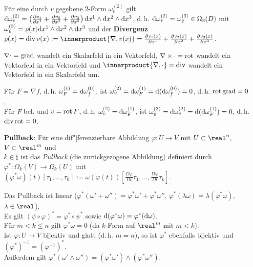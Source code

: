 Für eine durch $v$ gegebene $2$-Form $\omega_v^{(2)}$ gilt
$\mathrm{d} \omega_v^{(2)} = \left(\frac{\partial v_1}{\partial x^1} +
\frac{\partial v_2}{\partial x^2} + \frac{\partial v_3}{\partial x^3}\right)
\mathrm{d} x^1 \land \mathrm{d} x^2 \land \mathrm{d} x^3$, d.\,h.
$\mathrm{d} \omega_v^{(2)} = \omega_\varrho^{(3)} \in \Omega_3(D)$ mit
$\omega_\varrho^{(3)} = \varrho(x) \mathrm{d} x^1 \land \mathrm{d} x^2 \land \mathrm{d} x^3$ und
der \textbf{Divergenz} \\
$\varrho(x) = \div v(x) := \innerproduct{\nabla, v(x)} =
\frac{\partial v_1(x)}{\partial x^1} +
\frac{\partial v_2(x)}{\partial x^2} + \frac{\partial v_3(x)}{\partial x^3}$.

$\nabla \cdot = \operatorname{grad}$ wandelt ein Skalarfeld in ein Vektorfeld,
$\nabla \times \cdot = \operatorname{rot}$ wandelt ein Vektorfeld in ein Vektorfeld und
$\innerproduct{\nabla, \cdot} = \div$ wandelt ein Vektorfeld in ein Skalarfeld um.

Für $F = \nabla f$, d.\,h. $\omega_F^{(1)} = \mathrm{d} \omega_f^{(0)}$, ist
$\omega_v^{(2)} = \mathrm{d} \omega_F^{(1)} = \mathrm{d} (\mathrm{d} \omega_f^{(0)}) = 0$, d.\,h.
\textbf{$\operatorname{rot} \operatorname{grad} = 0$}. \\
Für $F$ bel. und $v = \operatorname{rot} F$, d.\,h. $\omega_v^{(2)} = \mathrm{d} \omega_F^{(1)}$,
ist $\omega_\varrho^{(3)} = \mathrm{d} \omega_v^{(2)} = \mathrm{d} (\mathrm{d} \omega_F^{(1)}) = 0$,
d.\,h. \textbf{$\operatorname{div} \operatorname{rot} = 0$}.

\linie

\textbf{Pullback}:
Für eine dif"|ferenzierbare Abbildung $\varphi\colon U \rightarrow V$ mit
$U \subset \real^n$, $V \subset \real^m$ und \\
$k \in \natural$
ist das \emph{Pullback} (die zurückgezogene Abbildung) definiert durch \\
$\varphi^\ast\colon \Omega_k(V) \rightarrow \Omega_k(U)$ mit
$(\varphi^\ast \omega)(t)[\tau_1, \dotsc, \tau_k] :=
\omega(\varphi(t))\left[\frac{D\varphi}{Dt} \tau_1, \dotsc,
\frac{D\varphi}{Dt} \tau_k\right]$.

Das Pullback ist linear ($\varphi^\ast(\omega' + \omega'') =
\varphi^\ast \omega' + \varphi^\ast \omega''$,
$\varphi^\ast (\lambda \omega) = \lambda (\varphi^\ast \omega)$,
$\lambda \in \real$). \\
Es gilt $(\psi \circ \varphi)^\ast = \varphi^\ast \circ \psi^\ast$
sowie $\mathrm{d} (\varphi^\ast \omega) = \varphi^\ast (\mathrm{d} \omega)$. \\
Für $m < k \le n$ gilt $\varphi^\ast \omega = 0$
(da $k$-Form auf $\real^m$ mit $m < k$). \\
Ist $\varphi\colon U \rightarrow V$ bijektiv und glatt (d.\,h. $m = n$),
so ist $\varphi^\ast$ ebenfalls bijektiv und
$(\varphi^\ast)^{-1} = (\varphi^{-1})^\ast$. \\
Außerdem gilt $\varphi^\ast(\omega' \land \omega'') =
(\varphi^\ast \omega') \land (\varphi^\ast \omega'')$.

